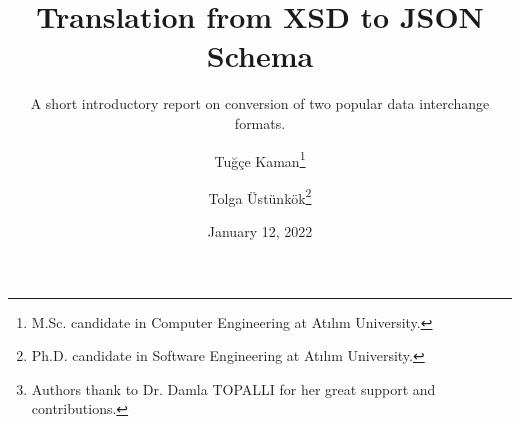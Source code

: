 \documentclass[paper=a4,oneside,fontsize=12,parskip=full,titlepage=firstiscover,toc=sectionentrywithdots]{scrartcl}
\begin{document}
    \titlehead{Atılım University\\Department of Computer Engineering}
    \title{Translation from XSD to JSON Schema}
    \subtitle{A short introductory report on conversion of two popular data interchange formats.}
    \author{Tuğçe Kaman\thanks{M.Sc. candidate in Computer Engineering at Atılım University.} \and Tolga Üstünkök\thanks{Ph.D. candidate in Software Engineering at Atılım University.}}
    \date{January 12, 2022}
    \publishers{CMPE541 - Advanced Databases\thanks{Authors thank to Dr. Damla TOPALLI for her great support and contributions.}}
    \maketitle
    \tableofcontents\newpage

    
    
    

    \printbibliography[heading=bibintoc]
\end{document}
